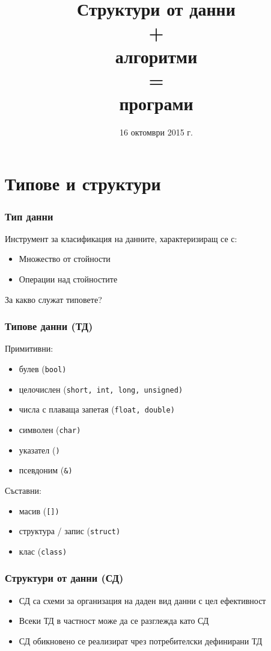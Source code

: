 \documentclass{beamer}
\title[СД+А=П]{Структури от данни\\+\\алгоритми\\=\\програми}
\date{16 октомври 2015 г.}
\begin{document}
\begin{frame}
  \titlepage
\end{frame}

\section{Типове и структури}

\begin{frame}
  \frametitle{Тип данни}

  Инструмент за класификация на данните, характеризиращ се с:
  \begin{itemize}
  \item Множество от стойности
  \item Операции над стойностите
  \end{itemize}
  \vspace{1em}

  \pause

  \alert{За какво служат типовете?}

\end{frame}

\begin{frame}
  \frametitle{Типове данни (ТД)}

  Примитивни:
  \begin{itemize}
  \item булев (\tt{bool})
  \item целочислен (\tt{short}, \tt{int}, \tt{long}, \tt{unsigned})
  \item числа с плаваща запетая (\tt{float}, \tt{double})
  \item символен (\tt{char})
  \item указател (\tt*)
  \item псевдоним (\tt\&)
  \end{itemize}

  Съставни:
  \begin{itemize}
  \item масив (\tt{[]})
  \item структура / запис (\tt{struct})
  \item клас (\tt{class})
  \end{itemize}
\end{frame}

\begin{frame}
  \frametitle{Структури от данни (СД)}

  \begin{itemize}[<+->]
  \item СД са схеми за организация на даден вид данни с цел ефективност
  \item Всеки ТД в частност може да се разглежда като СД
  \item СД обикновено се реализират чрез потребителски дефинирани ТД
  \end{itemize}
\end{frame}
\end{document}
